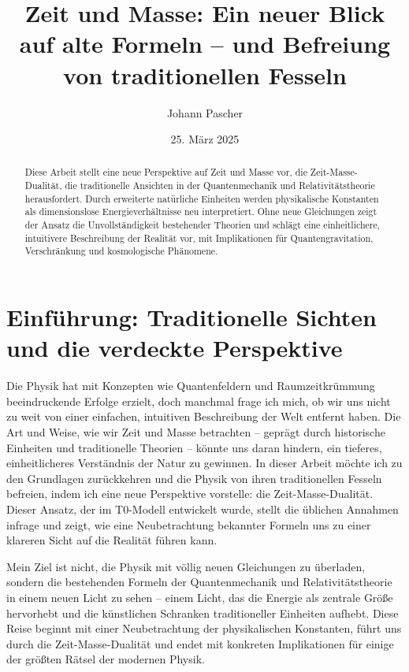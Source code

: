 \documentclass[a4paper,12pt]{article}
\title{Zeit und Masse: Ein neuer Blick auf alte Formeln – und Befreiung von traditionellen Fesseln}
\author{Johann Pascher}
\date{25. März 2025}
\begin{document}
	
	\maketitle
	
	\begin{abstract}
		Diese Arbeit stellt eine neue Perspektive auf Zeit und Masse vor, die Zeit-Masse-Dualität, die traditionelle Ansichten in der Quantenmechanik und Relativitätstheorie herausfordert. Durch erweiterte natürliche Einheiten werden physikalische Konstanten als dimensionslose Energieverhältnisse neu interpretiert. Ohne neue Gleichungen zeigt der Ansatz die Unvollständigkeit bestehender Theorien und schlägt eine einheitlichere, intuitivere Beschreibung der Realität vor, mit Implikationen für Quantengravitation, Verschränkung und kosmologische Phänomene.
	\end{abstract}
	
	\tableofcontents
	\newpage
	
	\section{Einführung: Traditionelle Sichten und die verdeckte Perspektive}
	
	Die Physik hat mit Konzepten wie Quantenfeldern und Raumzeitkrümmung beeindruckende Erfolge erzielt, doch manchmal frage ich mich, ob wir uns nicht zu weit von einer einfachen, intuitiven Beschreibung der Welt entfernt haben. Die Art und Weise, wie wir Zeit und Masse betrachten – geprägt durch historische Einheiten und traditionelle Theorien – könnte uns daran hindern, ein tieferes, einheitlicheres Verständnis der Natur zu gewinnen. In dieser Arbeit möchte ich zu den Grundlagen zurückkehren und die Physik von ihren traditionellen Fesseln befreien, indem ich eine neue Perspektive vorstelle: die Zeit-Masse-Dualität. Dieser Ansatz, der im T0-Modell entwickelt wurde, stellt die üblichen Annahmen infrage und zeigt, wie eine Neubetrachtung bekannter Formeln uns zu einer klareren Sicht auf die Realität führen kann.
	
	Mein Ziel ist nicht, die Physik mit völlig neuen Gleichungen zu überladen, sondern die bestehenden Formeln der Quantenmechanik und Relativitätstheorie in einem neuen Licht zu sehen – einem Licht, das die Energie als zentrale Größe hervorhebt und die künstlichen Schranken traditioneller Einheiten aufhebt. Diese Reise beginnt mit einer Neubetrachtung der physikalischen Konstanten, führt uns durch die Zeit-Masse-Dualität und endet mit konkreten Implikationen für einige der größten Rätsel der modernen Physik.
	
\end{document}
